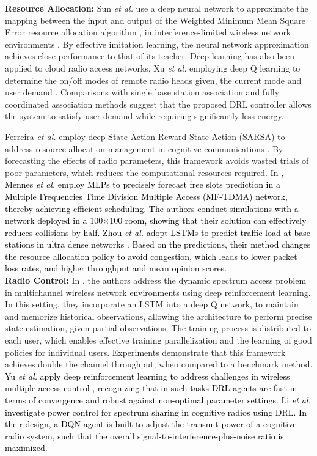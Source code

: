 \documentclass[journal,comsoc,letter]{IEEEtran}
\newcommand{\rev}[1]{\textcolor{black}{#1}}
\begin{document}
\noindent\textbf{Resource Allocation:} Sun \emph{et al.} use a deep neural network to approximate the mapping between the input and output of the Weighted Minimum Mean Square Error resource allocation algorithm \cite{shi2011iteratively}, in interference-limited wireless network environments \cite{sun2017learning}. By effective imitation learning, the neural network approximation achieves close performance to that of its teacher. Deep learning has also been applied to cloud radio access networks, Xu \emph{et al.} employing deep Q learning to determine the on/off modes of remote radio heads given, the current mode and user demand \cite{xu2017deep3}. Comparisons with single base station association and fully coordinated association methods suggest that the proposed DRL controller allows the system to satisfy user demand while requiring significantly less energy. 

Ferreira \emph{et al.} employ deep State-Action-Reward-State-Action (SARSA) to address resource allocation management in cognitive communications \cite{ferreira2017multi}. By forecasting the effects of radio parameters, this framework avoids wasted trials of poor parameters, which reduces the computational resources required. \rev{In \cite{mennes2018neural}, Mennes \emph{et al.} employ MLPs to precisely forecast free slots prediction in a Multiple Frequencies Time Division Multiple Access (MF-TDMA) network, thereby achieving efficient scheduling. The authors conduct simulations with a network deployed in a 100$\times$100 room, showing that their solution can effectively reduces collisions by half. Zhou \emph{et al.} adopt LSTMs to predict traffic load at base stations in ultra dense networks \cite{8553651}. Based on the predictions, their method changes the resource allocation policy to avoid congestion, which leads to lower packet loss rates, and higher throughput and mean opinion scores.}\\
 
\noindent\textbf{Radio Control:} In \cite{naparstek2017deep}, the authors address the dynamic spectrum access problem in multichannel wireless network environments using deep reinforcement learning. In this setting, they incorporate an LSTM into a deep Q network, to maintain and memorize historical observations, allowing the architecture to perform precise state estimation, given partial observations. The training process is distributed to each user, which enables effective training parallelization and the learning of good policies for individual users. Experiments demonstrate that this framework achieves double the channel throughput, when compared to a benchmark method. \rev{Yu \emph{et al.} apply deep reinforcement learning to address challenges in wireless multiple access control \cite{yu2018deep2}, recognizing that in such tasks DRL agents are fast in terms of convergence and robust against non-optimal parameter settings. Li \emph{et al.} investigate power control for spectrum sharing in cognitive radios using DRL. In their design, a DQN agent is built to adjust the transmit power of a cognitive radio system, such that the overall signal-to-interference-plus-noise ratio is maximized.}
\end{document}
